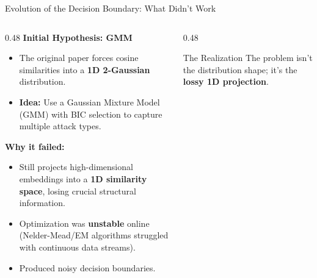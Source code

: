 \documentclass[aspectratio=169]{beamer}
\begin{document}
\begin{frame}{Evolution of the Decision Boundary: What Didn't Work}
    \begin{columns}[T]
        \begin{column}{0.48\textwidth}
            \textbf{Initial Hypothesis: GMM}
            \begin{itemize}
                \item The original paper forces cosine similarities into a \textbf{1D 2-Gaussian} distribution.
                \item \textbf{Idea:} Use a Gaussian Mixture Model (GMM) with BIC selection to capture multiple attack types.
            \end{itemize}

            \vspace{0.3cm}
            \textbf{Why it failed:}
            \begin{itemize}
                \item Still projects high-dimensional embeddings into a \textbf{1D similarity space}, losing crucial structural information.
                \item Optimization was \textbf{unstable} online (Nelder-Mead/EM algorithms struggled with continuous data streams).
                \item Produced noisy decision boundaries.
            \end{itemize}
        \end{column}
        \begin{column}{0.48\textwidth}
            \centering

            \vspace{0.2cm}
            \begin{block}{The Realization}
                The problem isn't the distribution shape; it's the \textbf{lossy 1D projection}.
            \end{block}
        \end{column}
    \end{columns}
\end{frame}
\end{document}

